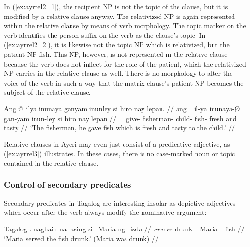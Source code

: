 \xe

In (\ref{ex:ayrrel2_1}), the recipient NP 
is not the topic of the clause, but it is modified by a relative clause anyway.
The relativized NP is again represented within the relative clause by means of
verb morphology. The topic marker on the verb identifies the person suffix on
the verb as the clause's topic. In (\ref{ex:ayrrel2_2}), it is likewise not the
topic NP which is relativized, but the patient NP 
{fish}. This NP, however, is not represented in the relative clause because the
verb does not inflect for the role of the patient, which the relativized NP
carries in the relative clause as well. There is no morphology to alter the
voice of the verb in such a way that the matrix clause's patient NP becomes the
subject of the relative clause.

\ex\label{ex:ayrrel3}\begingl
	\gla Ang @ ilya inunaya ganyam inunley si hiro nay lepan. //
	\glb ang= il-ya inunaya-Ø gan-yam inun-ley si hiro nay lepan //
	\glc \AgtT{}= give-\TsgM{} fisherman-\Top{} child-\Dat{} fish-\PargI{}
	\Rel{} fresh and tasty //
	\glft `The fisherman, he gave fish which is fresh and tasty to the
		child.' //
\endgl\xe

Relative clauses in Ayeri may even just consist of a predicative adjective, as
(\ref{ex:ayrrel3}) illustrates. In these cases, there is no case-marked noun or
topic contained in the relative clause.

\subsubsection{Control of secondary predicates}
\label{subsubsec:secpred}

Secondary predicates in Tagalog are interesting insofar as depictive adjectives
which occur after the verb always modify the nominative argument:

\pex\label{ex:tagsecpred}
Tagalog \parencite[adapted from][29--30]{kroeger1991}:
\a\label{ex:tagsecpred_1}%
	\begingl[aboveglbskip=1.5em, aboveglftskip=1.75em]
	\gla naghain na lasing si=Maria ng=isda //
	\glb \Av.\Pfv-serve%
		\Lnk{}
		drunk
		\Nom{}=Maria
		\Gen{}=fish
		//
	\glft `Maria served the fish drunk.' (Maria was drunk) //
\endgl
{}

